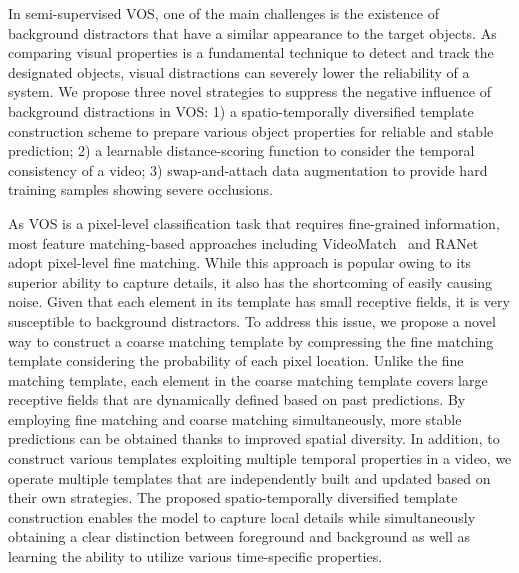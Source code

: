 \documentclass[runningheads]{llncs}
\begin{document}
In semi-supervised VOS, one of the main challenges is the existence of background distractors that have a similar appearance to the target objects. As comparing visual properties is a fundamental technique to detect and track the designated objects, visual distractions can severely lower the reliability of a system. We propose three novel strategies to suppress the negative influence of background distractions in VOS: 1) a spatio-temporally diversified template construction scheme to prepare various object properties for reliable and stable prediction; 2) a learnable distance-scoring function to consider the temporal consistency of a video; 3) swap-and-attach data augmentation to provide hard training samples showing severe occlusions.


As VOS is a pixel-level classification task that requires fine-grained information, most feature matching-based approaches including VideoMatch~\cite{VideoMatch} and RANet~\cite{RANet} adopt pixel-level fine matching. While this approach is popular owing to its superior ability to capture details, it also has the shortcoming of easily causing noise. Given that each element in its template has small receptive fields, it is very susceptible to background distractors. To address this issue, we propose a novel way to construct a coarse matching template by compressing the fine matching template considering the probability of each pixel location. Unlike the fine matching template, each element in the coarse matching template covers large receptive fields that are dynamically defined based on past predictions. By employing fine matching and coarse matching simultaneously, more stable predictions can be obtained thanks to improved spatial diversity. In addition, to construct various templates exploiting multiple temporal properties in a video, we operate multiple templates that are independently built and updated based on their own strategies. The proposed spatio-temporally diversified template construction enables the model to capture local details while simultaneously obtaining a clear distinction between foreground and background as well as learning the ability to utilize various time-specific properties. 
\end{document}
